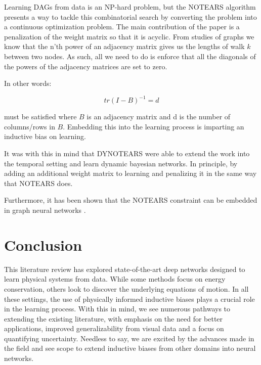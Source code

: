\documentclass{article}
\begin{document}
Learning DAGs from data is an NP-hard problem, but the NOTEARS algorithm \cite{zheng_dags_2018} presents a way to tackle this combinatorial search by converting the problem into a continuous optimization problem. The main contribution of the paper is a penalization of the weight matrix so that it is acyclic. From studies of graphs we know that the n'th power of an adjacency matrix gives us the lengths of walk $k$ between two nodes. As such, all we need to do is enforce that all the diagonals of the powers of the adjacency matrices are set to zero. 

In other words:

$$ tr(I-B)^{-1} = d $$

must be satisfied where $B$ is an adjacency matrix and d is the number of columns/rows in $B$. Embedding this into the learning process is imparting an inductive bias on learning. 

It was with this in mind that DYNOTEARS \cite{pamfil_dynotears_2020} were able to extend the work into the temporal setting and learn dynamic bayesian networks. In principle, by adding an additional weight matrix to learning and penalizing it in the same way that NOTEARS does.

Furthermore, it has been shown that the NOTEARS constraint can be embedded in graph neural networks \cite{lachapelle_gradient-based_2020,yu_dag-gnn_nodate}.


\section{Conclusion}

This literature review has explored state-of-the-art deep networks designed to learn physical systems from data. While some methods focus on energy conservation, others look to discover the underlying equations of motion. In all these settings, the use of physically informed inductive biases plays a crucial role in the learning process. With this in mind, we see numerous pathways to extending the existing literature, with emphasis on the need for better applications, improved generalizability from visual data and a focus on quantifying uncertainty. Needless to say, we are excited by the advances made in the field and see scope to extend inductive biases from other domains into neural networks.
\end{document}
